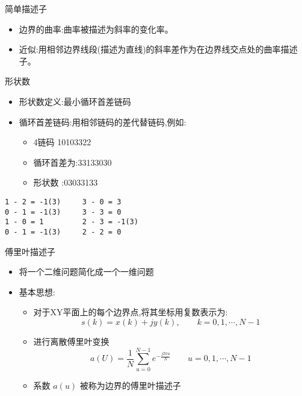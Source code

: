 \documentclass[presentation]{beamer}
\begin{document}
\begin{frame}[label={sec:orgb8cf3fd}]{简单描述子}
\begin{itemize}
\item 边界的曲率:曲率被描述为斜率的变化率。
\item 近似:用相邻边界线段(描述为直线)的斜率差作为在边界线交点处的曲率描述子。
\end{itemize}
\end{frame}

\begin{frame}[label={sec:org52fe989},fragile]{形状数}
 \begin{itemize}
\item 形状数定义:最小循环首差链码
\item 循环首差链码:用相邻链码的差代替链码,例如:
\begin{itemize}
\item 4链码 10103322
\item 循环首差为:33133030
\item 形状数 :03033133
\end{itemize}
\end{itemize}
\begin{verbatim}
1 - 2 = -1(3)     3 - 0 = 3
0 - 1 = -1(3)     3 - 3 = 0
1 - 0 = 1         2 - 3 = -1(3)
0 - 1 = -1(3)     2 - 2 = 0
\end{verbatim}
\end{frame}

\begin{frame}[label={sec:org76428c0}]{傅里叶描述子}
\begin{itemize}
\item 将一个二维问题简化成一个一维问题
\item 基本思想:
\begin{itemize}
\item 对于XY平面上的每个边界点,将其坐标用复数表示为: 
\[ s(k) = x(k) + jy(k),\qquad  k=0,1,\cdots,N-1 \]
\item 进行离散傅里叶变换
\[ a(U) = \frac{1}{N}\sum_{u=0}^{N-1}e^{-\frac{j2\pi u}{N} }\qquad  u=0,1,\cdots,N-1 \]
\item 系数 \(a(u)\) 被称为边界的傅里叶描述子
\end{itemize}
\end{itemize}
\end{frame}
\end{document}
